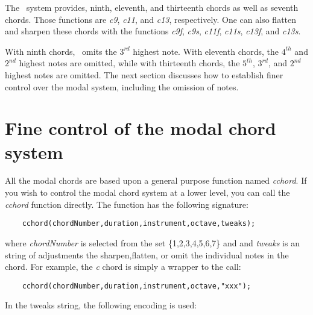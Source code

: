 \documentclass{article}
\begin{document}
The \songlib\ system provides, ninth, eleventh, and thirteenth
chords as well as seventh chords. Those functions are
{\it c9}, {\it c11}, and {\it c13}, respectively.
One can also flatten and sharpen these chords with the functions
{\it c9f},
{\it c9s},
{\it c11f},
{\it c11s},
{\it c13f},
and
{\it c13s}.

With ninth chords, \songlib\ omits the $3^{rd}$ highest note. With
eleventh chords, the $4^{th}$ and $2^{nd}$ highest notes are omitted, while
with thirteenth chords, the $5^{th}$, $3^{rd}$, and $2^{nd}$ highest notes
are omitted.
The next section discusses
how to establish finer control over the modal system,
including the omission of notes.

\section*{Fine control of the modal chord system}

All the modal chords are based upon a general purpose function
named {\it cchord}. If you wish to control
the modal chord system at a lower level,
you can call the {\it cchord} function directly.
The function
has the following signature:

\begin{verbatim}
    cchord(chordNumber,duration,instrument,octave,tweaks);
\end{verbatim}

where
{\it chordNumber} is selected from the set \{1,2,3,4,5,6,7\} and
and {\it tweaks} is an string of adjustments the sharpen,flatten,
or omit
the individual notes in the chord. For example, the {\it c} chord
is simply a wrapper to the call:

\begin{verbatim}
    cchord(chordNumber,duration,instrument,octave,"xxx");
\end{verbatim}

In the tweaks string, the following encoding
is used:
\end{document}
